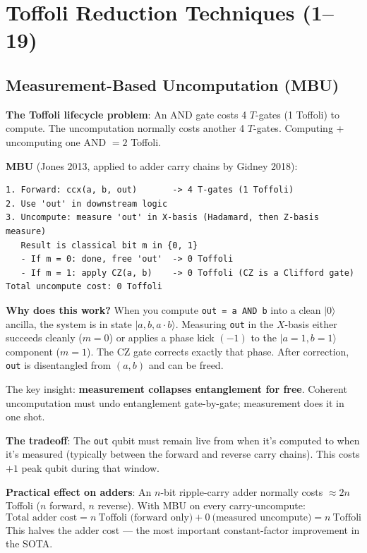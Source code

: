 \documentclass[11pt,a4paper]{article}
\newcommand{\ket}[1]{$|#1\rangle$\xspace}
\newcommand{\tof}{Toffoli\xspace}
\begin{document}
\section{Toffoli Reduction Techniques (1--19)}
\label{sec:toftech}

\subsection{Measurement-Based Uncomputation (MBU)}
\label{sec:mbu}

\textbf{The \tof lifecycle problem}: An AND gate costs 4 $T$-gates (1 Toffoli) to compute. The
uncomputation normally costs another 4 $T$-gates. Computing + uncomputing one AND $= 2$ Toffoli.

\textbf{MBU} (Jones 2013, applied to adder carry chains by Gidney 2018):
\begin{lstlisting}
1. Forward: ccx(a, b, out)       -> 4 T-gates (1 Toffoli)
2. Use 'out' in downstream logic
3. Uncompute: measure 'out' in X-basis (Hadamard, then Z-basis measure)
   Result is classical bit m in {0, 1}
   - If m = 0: done, free 'out'  -> 0 Toffoli
   - If m = 1: apply CZ(a, b)    -> 0 Toffoli (CZ is a Clifford gate)
Total uncompute cost: 0 Toffoli
\end{lstlisting}

\textbf{Why does this work?} When you compute \texttt{out = a AND b} into a clean \ket{0}
ancilla, the system is in state $|a, b, a\cdot b\rangle$. Measuring \texttt{out} in the
$X$-basis either succeeds cleanly ($m=0$) or applies a phase kick $(-1)$ to the
$|a=1, b=1\rangle$ component ($m=1$). The CZ gate corrects exactly that phase. After
correction, \texttt{out} is disentangled from $(a,b)$ and can be freed.

The key insight: \textbf{measurement collapses entanglement for free}. Coherent uncomputation
must undo entanglement gate-by-gate; measurement does it in one shot.

\textbf{The tradeoff}: The \texttt{out} qubit must remain live from when it's computed to
when it's measured (typically between the forward and reverse carry chains). This costs $+1$
peak qubit during that window.

\textbf{Practical effect on adders}: An $n$-bit ripple-carry adder normally costs $\approx 2n$
Toffoli ($n$ forward, $n$ reverse). With MBU on every carry-uncompute:
\[
  \text{Total adder cost} = n\ \text{Toffoli (forward only)} + 0\ \text{(measured uncompute)} = n\ \text{Toffoli}
\]
This halves the adder cost --- the most important constant-factor improvement in the SOTA.
\end{document}
